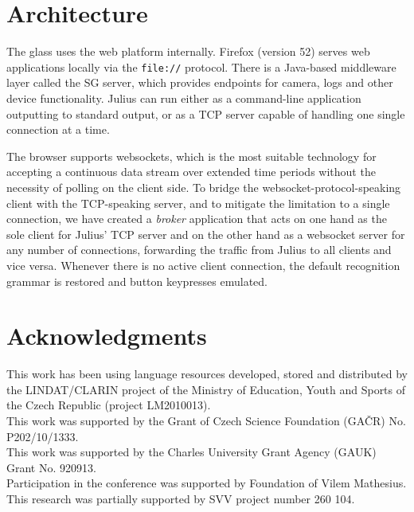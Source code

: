 \documentclass{llncs}
\begin{document}
\section{Architecture}

The glass uses the web platform internally. Firefox (version 52) serves web applications
locally via the \texttt{file://} protocol. There is a Java-based middleware
layer called the SG server, which provides endpoints for camera, logs and other
device functionality. Julius can run either as a command-line application
outputting to standard output, or as a TCP server capable of handling one single
connection at a time.

The browser supports websockets, which is the most suitable technology for
accepting a continuous data stream over extended time periods without the
necessity of polling on the client side. To bridge the
websocket-protocol-speaking client with the TCP-speaking server, and to mitigate
the limitation to a single connection, we have created a {\em broker}
application that acts on one hand as the sole client for Julius' TCP server and
on the other hand as a websocket server for any number of connections,
forwarding the traffic from Julius to all clients and vice versa. Whenever there
is no active client connection, the default recognition grammar is restored and
button keypresses emulated.



\section*{Acknowledgments}

This work has been using language resources developed, stored and distributed by the LINDAT/CLARIN project of the Ministry of Education, Youth and Sports of the Czech Republic (project LM2010013).
\\
This work was supported by the Grant of Czech Science Foundation (GA\v{C}R) No. P202/10/1333.
\\
This work was supported by the Charles University Grant Agency (GAUK) Grant No. 920913.
\\
Participation in the conference was supported by Foundation of Vilem Mathesius.
\\
This research was partially supported by SVV project number 260 104.




\end{document}
